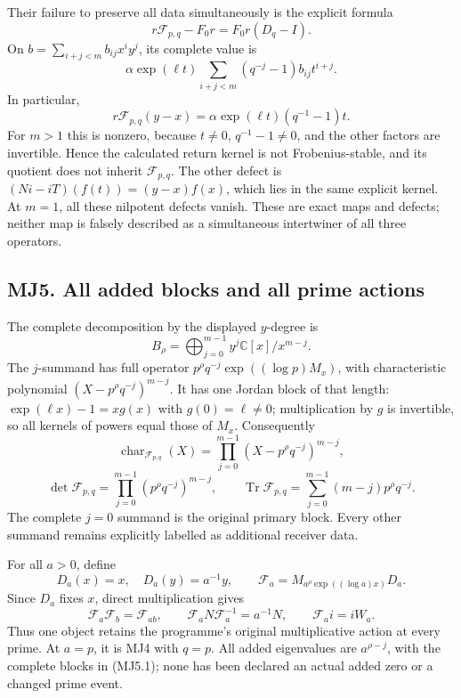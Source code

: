 Their failure to preserve all data simultaneously is the explicit
formula \[
r\mathcal F_{p,q}-F_0r=F_0r(D_q-I).
\tag{MJ4.7}
\] On \(b=\sum_{i+j<m}b_{ij}x^iy^j\), its complete value is \[
\alpha\exp(\ell t)\sum_{i+j<m}(q^{-j}-1)b_{ij}t^{i+j}.
\tag{MJ4.8}
\] In particular, \[
r\mathcal F_{p,q}(y-x)=\alpha\exp(\ell t)(q^{-1}-1)t.
\tag{MJ4.9}
\] For \(m>1\) this is nonzero, because \(t\ne0\), \(q^{-1}-1\ne0\), and
the other factors are invertible. Hence the calculated return kernel is
not Frobenius-stable, and its quotient does not inherit
\(\mathcal F_{p,q}\). The other defect is \((Ni-iT)(f(t))=(y-x)f(x)\),
which lies in the same explicit kernel. At \(m=1\), all these nilpotent
defects vanish. These are exact maps and defects; neither map is falsely
described as a simultaneous intertwiner of all three operators.

\subsection{MJ5. All added blocks and all prime
actions}\label{mj5.-all-added-blocks-and-all-prime-actions}

The complete decomposition by the displayed \(y\)-degree is \[
B_\rho=\bigoplus_{j=0}^{m-1}y^j\mathbb C[x]/x^{m-j}.
\tag{MJ5.1}
\] The \(j\)-summand has full operator
\(p^\rho q^{-j}\exp((\log p)M_x)\), with characteristic polynomial
\((X-p^\rho q^{-j})^{m-j}\). It has one Jordan block of that length:
\(\exp(\ell x)-1=xg(x)\) with \(g(0)=\ell\ne0\); multiplication by \(g\)
is invertible, so all kernels of powers equal those of \(M_x\).
Consequently \[
\operatorname{char}_{\mathcal F_{p,q}}(X)=\prod_{j=0}^{m-1}(X-p^\rho q^{-j})^{m-j},
\] \[
\det\mathcal F_{p,q}=\prod_{j=0}^{m-1}(p^\rho q^{-j})^{m-j},\qquad
\operatorname{Tr}\mathcal F_{p,q}=\sum_{j=0}^{m-1}(m-j)p^\rho q^{-j}.
\tag{MJ5.2}
\] The complete \(j=0\) summand is the original primary block. Every
other summand remains explicitly labelled as additional receiver data.

For all \(a>0\), define \[
D_a(x)=x,\quad D_a(y)=a^{-1}y,\qquad
\mathcal F_a=M_{a^\rho\exp((\log a)x)}D_a.
\tag{MJ5.3}
\] Since \(D_a\) fixes \(x\), direct multiplication gives \[
\mathcal F_a\mathcal F_b=\mathcal F_{ab},\qquad
\mathcal F_aN\mathcal F_a^{-1}=a^{-1}N,\qquad
\mathcal F_ai=iW_a.
\tag{MJ5.4}
\] Thus one object retains the programme's original multiplicative
action at every prime. At \(a=p\), it is MJ4 with \(q=p\). All added
eigenvalues are \(a^{\rho-j}\), with the complete blocks in (MJ5.1);
none has been declared an actual added zero or a changed prime event.

